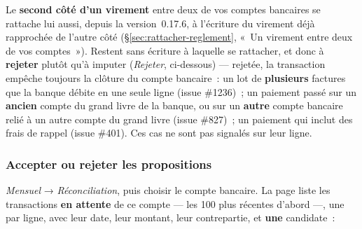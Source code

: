 \documentclass[a4paper,11pt,oneside]{article}
\begin{document}
\begin{keshwarning}[title=\faExclamationTriangle\ Dépense déjà réglée par un autre chemin]
Le \textbf{second côté d'un virement} entre deux de vos comptes bancaires se rattache lui aussi,
depuis la version~0.17.6, à l'écriture du virement déjà rapprochée de l'autre côté
(\S\ref{sec:rattacher-reglement}, «~Un virement entre deux de vos comptes~»). Restent sans écriture
à laquelle se rattacher, et donc à \textbf{rejeter} plutôt qu'à imputer (\emph{Rejeter},
ci-dessous) --- rejetée, la transaction empêche toujours la clôture du compte bancaire~: un lot de
\textbf{plusieurs} factures que la banque débite en une seule ligne (issue \#1236)~; un paiement passé
sur un \textbf{ancien} compte du grand livre de la banque, ou sur un \textbf{autre} compte
bancaire relié à un autre compte du grand livre (issue \#827)~; un paiement qui inclut des frais de rappel (issue \#401).
Ces cas ne sont pas signalés sur leur ligne.
\end{keshwarning}

\subsubsection{Accepter ou rejeter les propositions}

\emph{Mensuel} → \emph{Réconciliation}, puis choisir le compte bancaire. La page liste les transactions \textbf{en attente} de ce compte --- les 100 plus récentes d'abord ---, une par ligne, avec leur date, leur montant, leur contrepartie, et \textbf{une} candidate~:
\end{document}
